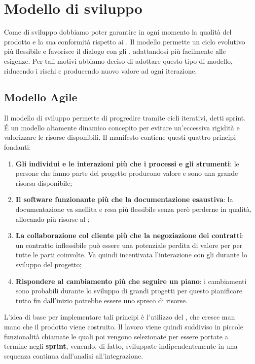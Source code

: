 \section{Modello di sviluppo}
Come  di sviluppo dobbiamo poter garantire in ogni momento la qualità del prodotto  e la sua conformità rispetto ai . \newline
Il modello  permette un ciclo evolutivo più flessibile e favorisce il dialogo con gli , adattandosi più facilmente alle esigenze. \newline 
Per tali motivi abbiamo deciso di adottare questo tipo di modello, riducendo i rischi e producendo nuovo valore ad ogni iterazione.

\subsection{Modello Agile}
Il modello di sviluppo  permette di progredire tramite cicli iterativi, detti sprint.
É un modello altamente dinamico concepito per evitare un'eccessiva rigidità e valorizzare le risorse disponibili. \newline
Il manifesto  contiene questi quattro principi fondanti:

\begin{enumerate}
    \item \textbf{Gli individui e le interazioni più che i processi e gli strumenti}: le persone che fanno parte del progetto producono valore e sono una grande risorsa disponibile;
    \item \textbf{Il software funzionante più che la documentazione esaustiva}: la documentazione va snellita e resa più flessibile senza però perderne in qualità, allocando più risorse al ;
    \item \textbf{La collaborazione col cliente più che la negoziazione dei contratti}: un contratto inflessibile può essere una potenziale perdita di valore per per tutte le parti coinvolte. Va quindi incentivata l’interazione con gli  durante lo sviluppo del progetto;
    \item \textbf{Rispondere al cambiamento più che seguire un piano}: i cambiamenti sono probabili durante lo sviluppo di grandi progetti per questo pianificare tutto fin dall'inizio potrebbe essere uno spreco di risorse.
\end{enumerate}
L’idea di base per implementare tali principi è l’utilizzo del \textbf{}, che cresce man mano che il prodotto viene costruito. \newline
Il lavoro viene quindi suddiviso in piccole funzionalità chiamate \textbf{} le quali poi vengono selezionate per essere portate a termine negli \textbf{sprint}, venendo, di fatto, sviluppate indipendentemente in una sequenza continua dall’analisi all’integrazione. \newline

